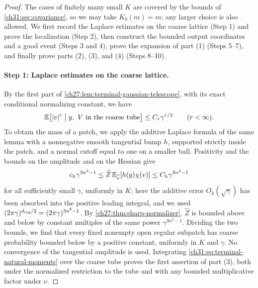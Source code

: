 \begin{proof}
The cases of finitely many small $K$ are covered by the bounds of \cref{ch31:sec:covariance}, so we may take $K_0(m)=m$; any larger choice is also allowed. We first record the Laplace estimates on the coarse lattice (Step 1) and prove the localization (Step 2), then construct the bounded output coordinates and a good event (Steps 3 and 4), prove the expansion of part (1) (Steps 5--7), and finally prove parts (2), (3), and (4) (Steps 8--10).

\paragraph{Step 1: Laplace estimates on the coarse lattice.}
By the first part of \cref{ch27:lem:terminal-gaussian-telescope}, with its exact conditional normalizing constant, we have
\begin{equation}\label{ch31:eq:terminal-natural-moments}
 \mathbb E\bigl[\lvert v\rvert^r\bigm|y,\ V\text{ in the coarse tube}\bigr]\le C_r\gamma^{r/2}\qquad(r<\infty).
\end{equation}
To obtain the mass of a patch, we apply the additive Laplace formula of the same lemma with a nonnegative smooth tangential bump $h$, supported strictly inside the patch, and a normal cutoff equal to one on a smaller ball. Positivity and the bounds on the amplitude and on the Hessian give
\[
 c_h\gamma^{3n^3-1}\le\widehat Z\,\mathbb E_{\widehat\nu}[h(y)\chi(v)]\le C_h\gamma^{3n^3-1}
\]
for all sufficiently small $\gamma$, uniformly in $K$; here the additive error $O_h(\sqrt\gamma)$ has been absorbed into the positive leading integral, and we used $(2\pi\gamma)^{d_{\rm reg}/2}=(2\pi\gamma)^{3n^3-1}$. By \cref{ch27:thm:sharp-normalizer}, $\widehat Z$ is bounded above and below by constant multiples of the same power $\gamma^{3n^3-1}$. Dividing the two bounds, we find that every fixed nonempty open regular subpatch has coarse probability bounded below by a positive constant, uniformly in $K$ and $\gamma$. No convergence of the tangential amplitude is used. Integrating \eqref{ch31:eq:terminal-natural-moments} over the coarse tube proves the first assertion of part (3), both under the normalized restriction to the tube and with any bounded multiplicative factor under $\nu$.


\end{proof}
